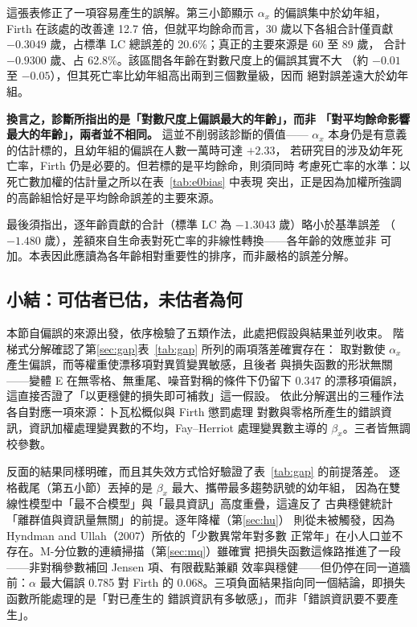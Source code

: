 \documentclass[UTF8, fontset=macnew, a4paper, 12pt]{ctexart}
\newcommand{\cn}[1]{\ding{\number\numexpr171+#1\relax}}
\begin{document}
這張表修正了一項容易產生的誤解。第三小節顯示 $\alpha_x$ 的偏誤集中於幼年組，
Firth 在該處的改善達 12.7 倍，但就平均餘命而言，30 歲以下各組合計僅貢獻
$-0.3049$ 歲，占標準 LC 總誤差的 20.6\%；真正的主要來源是 60 至 89 歲，
合計 $-0.9300$ 歲、占 62.8\%。該區間各年齡在對數尺度上的偏誤其實不大
（約 $-0.01$ 至 $-0.05$），但其死亡率比幼年組高出兩到三個數量級，因而
絕對誤差遠大於幼年組。

\textbf{換言之，診斷\cn{2}所指出的是「對數尺度上偏誤最大的年齡」，而非
「對平均餘命影響最大的年齡」，兩者並不相同。} 這並不削弱該診斷的價值——
$\alpha_x$ 本身仍是有意義的估計標的，且幼年組的偏誤在人數一萬時可達 $+2.33$，
若研究目的涉及幼年死亡率，Firth 仍是必要的。但若標的是平均餘命，則須同時
考慮死亡率的水準：以死亡數加權的估計量之所以在表~\ref{tab:e0bias} 中表現
突出，正是因為加權所強調的高齡組恰好是平均餘命誤差的主要來源。

最後須指出，逐年齡貢獻的合計（標準 LC 為 $-1.3043$ 歲）略小於基準誤差
（$-1.480$ 歲），差額來自生命表對死亡率的非線性轉換——各年齡的效應並非
可加。本表因此應讀為各年齡相對重要性的排序，而非嚴格的誤差分解。

\subsection{小結：可估者已估，未估者為何}

本節自偏誤的來源出發，依序檢驗了五類作法，此處把假設與結果並列收束。
階梯式分解確認了第\ref{sec:gap}表~\ref{tab:gap} 所列的兩項落差確實存在：
取對數使 $\alpha_x$ 產生偏誤，而等權重使漂移項對異質變異敏感，且後者
與損失函數的形狀無關——變體 E 在無零格、無重尾、噪音對稱的條件下仍留下
0.347 的漂移項偏誤，這直接否證了「以更穩健的損失即可補救」這一假設。
依此分解選出的三種作法各自對應一項來源：卜瓦松概似與 Firth 懲罰處理
對數與零格所產生的錯誤資訊，資訊加權處理變異數的不均，Fay--Herriot
處理變異數主導的 $\beta_x$。三者皆無調校參數。

反面的結果同樣明確，而且其失效方式恰好驗證了表~\ref{tab:gap} 的前提落差。
逐格截尾（第五小節）丟掉的是 $\beta_x$ 最大、攜帶最多趨勢訊號的幼年組，
因為在雙線性模型中「最不合模型」與「最具資訊」高度重疊，這違反了
古典穩健統計「離群值與資訊量無關」的前提。逐年降權（第\ref{sec:hu}）
則從未被觸發，因為 Hyndman and Ullah（2007）所依的「少數異常年對多數
正常年」在小人口並不存在。M-分位數的連續掃描（第\ref{sec:mq}）雖確實
把損失函數這條路推進了一段——非對稱參數補回 Jensen 項、有限截點兼顧
效率與穩健——但仍停在同一道牆前：$\alpha$ 最大偏誤 0.785 對 Firth 的
0.068。三項負面結果指向同一個結論，即損失函數所能處理的是「對已產生的
錯誤資訊有多敏感」，而非「錯誤資訊要不要產生」。
\end{document}
